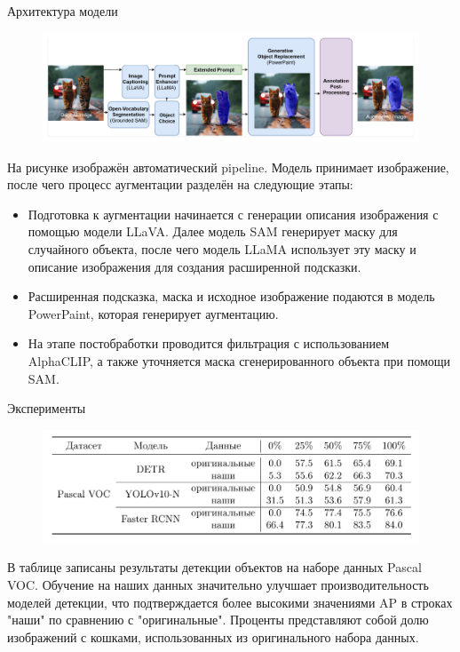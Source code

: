 \documentclass{beamer}
\begin{document}
\begin{frame}{Архитектура модели}

\begin{figure}[!t]
    \centering
    \includegraphics[width=1\textwidth]{aug_garage.pdf}
\end{figure}

\scriptsize
На рисунке изображён автоматический pipeline. Модель принимает изображение, после чего процесс аугментации разделён на следующие этапы:

\begin{itemize} \item Подготовка к аугментации начинается с генерации описания изображения с помощью модели LLaVA. Далее модель SAM генерирует маску для случайного объекта, после чего модель LLaMA использует эту маску и описание изображения для создания расширенной подсказки. \item Расширенная подсказка, маска и исходное изображение подаются в модель PowerPaint, которая генерирует аугментацию. \item На этапе постобработки проводится фильтрация с использованием AlphaCLIP, а также уточняется маска сгенерированного объекта при помощи SAM. \end{itemize}

\end{frame}

\begin{frame}{Эксперименты}

\begin{figure}[!t]
    \centering
    \includegraphics[width=1\textwidth]{1.jpeg}
\end{figure}

\scriptsize
В таблице записаны результаты детекции объектов на наборе данных Pascal VOC. Обучение на наших данных значительно улучшает производительность моделей детекции, что подтверждается более высокими значениями AP в строках "наши" по сравнению с "оригинальные". Проценты представляют собой долю изображений с кошками, использованных из оригинального набора данных.

\end{frame}
\end{document}
